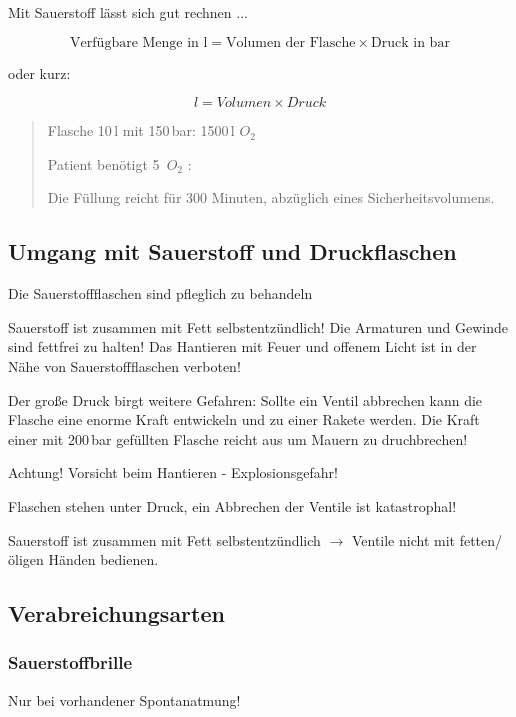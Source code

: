 Mit Sauerstoff l\"asst sich gut rechnen ...

\begin{equation}
\mbox{Verfügbare Menge in l} = {\mbox{Volumen der Flasche}}
\times {\mbox{Druck in bar}}
\end{equation}

oder kurz: 

\begin{equation}
l = {Volumen} \times {Druck}
\end{equation}




\begin{quotation}
Flasche 10\,l mit 150\,bar: 1500\,l  $O_2$

Patient ben\"otigt 5\, $O_2$ : 

Die F\"ullung reicht f\"ur 300 Minuten, abz\"uglich eines
Sicherheitsvolumens.
\end{quotation}

\subsection{Umgang mit Sauerstoff und Druckflaschen}

Die Sauerstoffflaschen sind pfleglich zu behandeln

Sauerstoff ist zusammen mit Fett selbstentz\"undlich! Die Armaturen und
Gewinde sind fettfrei zu halten! Das Hantieren mit Feuer und offenem
Licht ist in der N\"ahe von Sauerstoffflaschen verboten! 

Der gro{\ss}e Druck birgt weitere Gefahren: Sollte ein Ventil abbrechen
kann die Flasche eine enorme Kraft entwickeln und zu einer Rakete
werden. Die Kraft einer mit 200\,bar gef\"ullten Flasche reicht aus um
Mauern zu druchbrechen!  

Achtung! Vorsicht beim Hantieren -  Explosionsgefahr!

Flaschen stehen unter Druck, ein Abbrechen der Ventile ist katastrophal!

Sauerstoff ist zusammen mit Fett selbstentz\"undlich ${\rightarrow}$
Ventile nicht mit fetten/\"oligen H\"anden bedienen.

\subsection{Verabreichungsarten}
\subsubsection{Sauerstoffbrille}
Nur bei vorhandener Spontanatmung!

